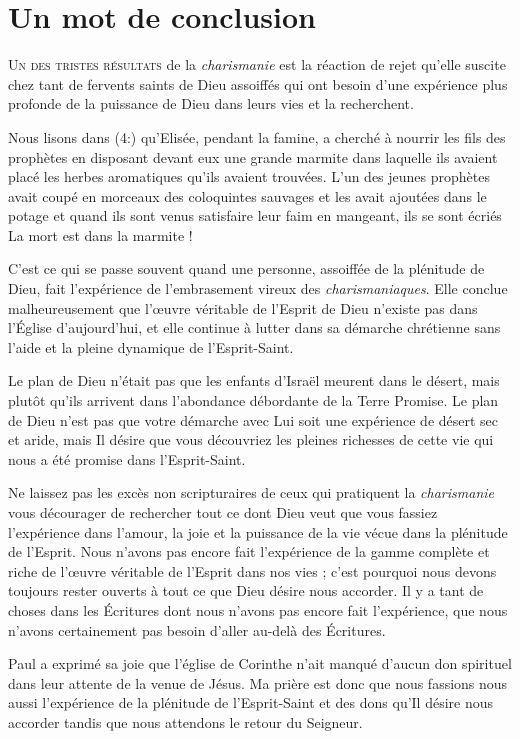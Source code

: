 \chapter{Un mot de conclusion}

\lettrine{U}{n des tristes résultats} de la \emph{charismanie}
 est la réaction de rejet
 qu'elle suscite chez tant de fervents saints de Dieu assoiffés
 qui ont besoin d'une expérience 
 plus profonde de la puissance de Dieu
 dans leurs vies et la recherchent.

Nous lisons dans (4:) qu'Elisée, pendant la famine,
 a cherché à nourrir les fils des prophètes en disposant devant eux
 une grande marmite dans laquelle ils avaient placé les herbes
 aromatiques qu'ils avaient trouvées.
 L'un des jeunes prophètes avait coupé en morceaux des coloquintes
 sauvages et les avait ajoutées dans le potage et quand ils sont venus
 satisfaire leur faim en mangeant, ils se sont écriés\frcolon{}
 \Og La mort est dans la marmite ! \Fg{}

C'est ce qui se passe souvent quand une personne,
 assoiffée de la plénitude de Dieu, fait l'expérience 
 de l'embrasement
 vireux des \emph{charismaniaques}. Elle conclue malheureusement
 que l'œuvre véritable de l'Esprit de Dieu n'existe pas
 dans l'Église d'aujourd'hui, et elle continue à lutter
 dans sa démarche chrétienne sans l'aide et la pleine dynamique
 de l'Esprit-Saint.

Le plan de Dieu n'était pas que les enfants d'Israël meurent
 dans le désert, mais plutôt qu'ils arrivent dans l'abondance débordante
 de la Terre Promise. Le plan de Dieu n'est pas que votre démarche
 avec Lui soit une expérience  de désert sec et aride,
 mais Il désire
 que vous découvriez les pleines richesses de cette vie
 qui nous a été promise dans l'Esprit-Saint.

Ne laissez pas les excès non scripturaires de ceux qui pratiquent 
la \emph{charismanie} vous décourager de rechercher tout ce dont Dieu
 veut que vous fassiez l'expérience  dans l'amour,
 la joie et la puissance de la vie vécue dans la plénitude de l'Esprit.
 Nous n'avons pas encore fait l'expérience 
 de la gamme complète
 et riche de l'œuvre véritable de l'Esprit dans nos vies ;
 c'est pourquoi nous devons toujours rester ouverts
 à tout ce que Dieu désire nous accorder.
 Il y a tant de choses dans les Écritures dont nous n'avons pas encore
 fait l'expérience, 
 que nous n'avons certainement pas besoin
 d'aller au-delà des Écritures.

Paul a exprimé sa joie que l'église de Corinthe n'ait manqué
 d'aucun don spirituel dans leur attente de la venue de Jésus.
 Ma prière est donc que nous fassions
 nous aussi l'expérience 
 de la plénitude de l'Esprit-Saint et des dons qu'Il désire
 nous accorder tandis que nous attendons le retour du Seigneur.
\closechapter


